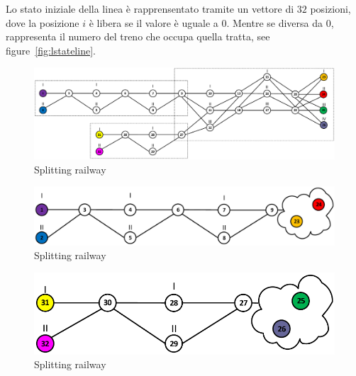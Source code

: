 \documentclass{ewic}
\begin{document}
			
			Lo stato iniziale della linea è rapprensentato tramite un vettore di $32$ posizioni, dove la posizione $i$ è libera se il valore è uguale a $0$. Mentre se diversa da $0$, rappresenta il numero del treno che occupa quella tratta, see figure~\ref{fig:lstateline}.
	
			
		
			\begin{figure}[htp]
				\begin{centering}	
				\includegraphics[scale=0.25]{img/esempioSplit}
				\caption{Splitting railway}
				\label{fig:split}
				\end{centering}
			\end{figure}	
			
			
			\begin{figure}[htp]
				\begin{centering}	
				\includegraphics[scale=0.35]{img/esempioScomp1}
				\caption{Splitting railway}
				\label{fig:scomposizione1}
				\end{centering}
			\end{figure}
			
			
			\begin{figure}[htp]
				\begin{centering}	
				\includegraphics[scale=0.35]{img/esempioScomp2}
				\caption{Splitting railway}
				\label{fig:scomposizione2}
				\end{centering}
			\end{figure}
			
\end{document}
